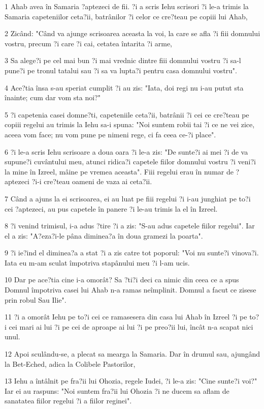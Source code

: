 \par 1 Ahab avea în Samaria ?aptezeci de fii. ?i a scris Iehu scrisori ?i le-a trimis la Samaria capeteniilor ceta?ii, batrânilor ?i celor ce cre?teau pe copiii lui Ahab,
\par 2 Zicând: "Când va ajunge scrisoarea aceasta la voi, la care se afla ?i fiii domnului vostru, precum ?i care ?i cai, cetatea întarita ?i arme,
\par 3 Sa alege?i pe cel mai bun ?i mai vrednic dintre fiii domnului vostru ?i sa-l pune?i pe tronul tatalui sau ?i sa va lupta?i pentru casa domnului vostru".
\par 4 Ace?tia însa s-au speriat cumplit ?i au zis: "Iata, doi regi nu i-au putut sta înainte; cum dar vom sta noi?"
\par 5 ?i capetenia casei domne?ti, capeteniile ceta?ii, batrânii ?i cei ce cre?teau pe copiii regelui au trimis la Iehu sa-i spuna: "Noi suntem robii tai ?i ce ne vei zice, aceea vom face; nu vom pune pe nimeni rege, ci fa ceea ce-?i place".
\par 6 ?i le-a scris Iehu scrisoare a doua oara ?i le-a zis: "De sunte?i ai mei ?i de va supune?i cuvântului meu, atunci ridica?i capetele fiilor domnului vostru ?i veni?i la mine în Izreel, mâine pe vremea aceasta". Fiii regelui erau în numar de ?aptezeci ?i-i cre?teau oameni de vaza ai ceta?ii.
\par 7 Când a ajuns la ei scrisoarea, ei au luat pe fiii regelui ?i i-au junghiat pe to?i cei ?aptezeci, au pus capetele în panere ?i le-au trimis la el în Izreel.
\par 8 ?i venind trimisul, i-a adus ?tire ?i a zis: "S-au adus capetele fiilor regelui". Iar el a zis: "A?eza?i-le pâna diminea?a în doua gramezi la poarta".
\par 9 ?i ie?ind el diminea?a a stat ?i a zis catre tot poporul: "Voi nu sunte?i vinova?i. Iata eu m-am sculat împotriva stapânului meu ?i l-am ucis.
\par 10 Dar pe ace?tia cine i-a omorât? Sa ?ti?i deci ca nimic din ceea ce a spus Domnul împotriva casei lui Ahab n-a ramas neîmplinit. Domnul a facut ce zisese prin robul Sau Ilie".
\par 11 ?i a omorât Iehu pe to?i cei ce ramasesera din casa lui Ahab în Izreel ?i pe to?i cei mari ai lui ?i pe cei de aproape ai lui ?i pe preo?ii lui, încât n-a scapat nici unul.
\par 12 Apoi sculându-se, a plecat sa mearga la Samaria. Dar în drumul sau, ajungând la Bet-Eched, adica la Colibele Pastorilor,
\par 13 Iehu a întâlnit pe fra?ii lui Ohozia, regele Iudei, ?i le-a zis: "Cine sunte?i voi?" Iar ei au raspuns: "Noi suntem fra?ii lui Ohozia ?i ne ducem sa aflam de sanatatea fiilor regelui ?i a fiilor reginei".
